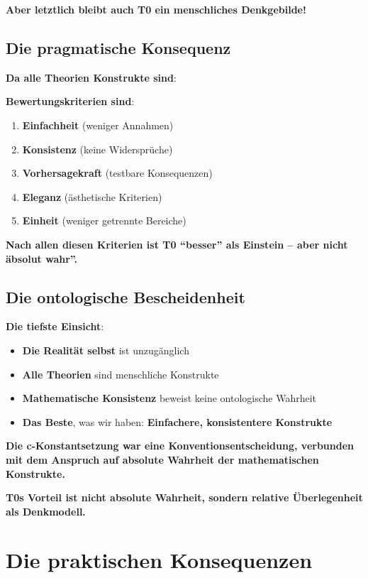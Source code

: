 	\textbf{Aber letztlich bleibt auch T0 ein menschliches Denkgebilde!}
	
	\subsection{Die pragmatische Konsequenz}
	
	\textbf{Da alle Theorien Konstrukte sind}:
	
	\textbf{Bewertungskriterien sind}:
	\begin{enumerate}
		\item \textbf{Einfachheit} (weniger Annahmen)
		\item \textbf{Konsistenz} (keine Widersprüche)
		\item \textbf{Vorhersagekraft} (testbare Konsequenzen)
		\item \textbf{Eleganz} (ästhetische Kriterien)
		\item \textbf{Einheit} (weniger getrennte Bereiche)
	\end{enumerate}
	
	\textbf{Nach allen diesen Kriterien ist T0 ``besser'' als Einstein – aber nicht äbsolut wahr''.}
	
	\subsection{Die ontologische Bescheidenheit}
	
	\textbf{Die tiefste Einsicht}:
	\begin{itemize}
		\item \textbf{Die Realität selbst} ist unzugänglich
		\item \textbf{Alle Theorien} sind menschliche Konstrukte
		\item \textbf{Mathematische Konsistenz} beweist keine ontologische Wahrheit
		\item \textbf{Das Beste}, was wir haben: \textbf{Einfachere, konsistentere Konstrukte}
	\end{itemize}
	
	\textbf{Die c-Konstantsetzung war eine Konventionsentscheidung, verbunden mit dem Anspruch auf absolute Wahrheit der mathematischen Konstrukte.}
	
	\textbf{T0s Vorteil ist nicht absolute Wahrheit, sondern relative Überlegenheit als Denkmodell.}
	
	\section{Die praktischen Konsequenzen}
	
